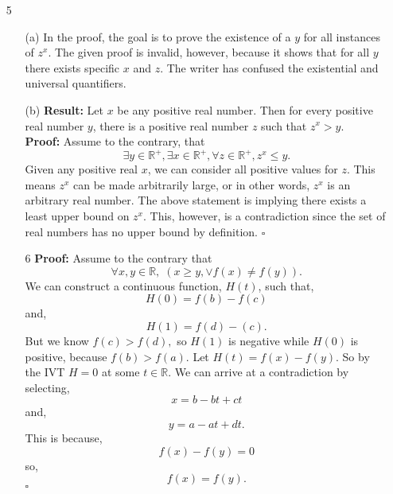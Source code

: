 \documentclass[12pt]{article}
\begin{document}
\begin{enumerate}
        \item[5]
            \begin{enumerate}
                \item [(a)] In the proof, the goal is to prove the existence of a $y$ for all instances of $z^x$. The given proof is invalid, however, because it shows that for all $y$ there exists specific $x$ and $z$. The writer has confused the existential and universal quantifiers. 
                
                \item[(b)] \textbf{Result: }Let $x$ be any positive real number. Then for every positive real number $y$,
                there is a positive real number $z$ such that $z^x>y$. \\
                \textbf{Proof: }Assume to the contrary, that 
                $$\exists y \in\mathbb{R^+}, \exists x \in\mathbb{R^+}, \forall z\in\mathbb{R^+}, z^x\leq y.$$
                Given any positive real $x$, we can consider all positive values for $z$. This means $z^x$ can be made arbitrarily large, or in other words, $z^x$ is an arbitrary real number. The above statement is implying there exists a least upper bound on $z^x$. This, however, is a contradiction since the set of real numbers has no upper bound by definition. 
                $\square$
        \item[6] 
                \textbf{Proof: }Assume to the contrary that 
                $$\forall x,y\in\mathbb{R},\;(x\geq y, \lor f(x)\neq f(y)).$$
                We can construct a continuous function, $H(t)$, such that,
                $$H(0) = f(b)-f(c)$$
                and,
                $$H(1) = f(d) - (c).$$
                But we know $f(c)>f(d),$ so $H(1)$ is negative while $H(0)$ is positive, because $f(b)>f(a)$.
                Let $H(t) = f(x) - f(y)$. So by the IVT $H=0$ at some $t\in\mathbb{R}$. We can arrive at a contradiction by selecting,
                $$x=b-bt+ct$$
                and,
                $$y=a-at+dt.$$
                This is because,
                $$f(x) - f(y) = 0$$
                so,
                $$f(x)=f(y).$$
                $\square$
        
            \end{enumerate}
             
            
    \end{enumerate}
        
\end{document}
